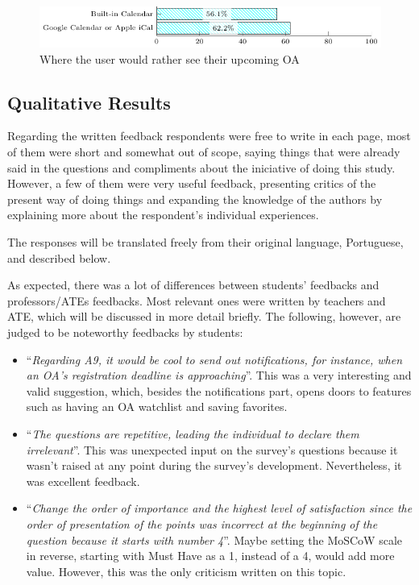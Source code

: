 \begin{figure}[!htb]
  \caption{Where the user would rather see their upcoming \ac{OA}}\label{fig:participant-a14}
  \begin{center}
    \includegraphics[width=13cm]{img/5-questions-participant-A14-1.pdf}
  \end{center}
\end{figure}

\subsection{Qualitative Results}\label{sec:survey-quali}

Regarding the written feedback respondents were free to write in each page, most of them were short and somewhat out of scope, saying things that were already said in the questions and compliments about the iniciative of doing this study. However, a few of them were very useful feedback, presenting critics of the present way of doing things and expanding the knowledge of the authors by explaining more about the respondent's individual experiences.

The responses will be translated freely from their original language, Portuguese, and described below.

As expected, there was a lot of differences between students' feedbacks and professors/\acp{ATE} feedbacks. Most relevant ones were written by teachers and \acs{ATE}, which will be discussed in more detail briefly. The following, however, are judged to be noteworthy feedbacks by students:
\begin{itemize}
  \item  ``\textit{Regarding A9, it would be cool to send out notifications, for instance, when an \ac{OA}'s registration deadline is approaching}''. This was a very interesting and valid suggestion, which, besides the notifications part, opens doors to features such as having an \ac{OA} watchlist and saving favorites.
  \item ``\textit{The questions are repetitive, leading the individual to declare them irrelevant}''. This was unexpected input on the survey's questions because it wasn't raised at any point during the survey's development. Nevertheless, it was excellent feedback.
  \item ``\textit{Change the order of importance and the highest level of satisfaction since the order of presentation of the points was incorrect at the beginning of the question because it starts with number 4}''. Maybe setting the MoSCoW scale in reverse, starting with Must Have as a 1, instead of a 4, would add more value. However, this was the only criticism written on this topic.
\end{itemize}

